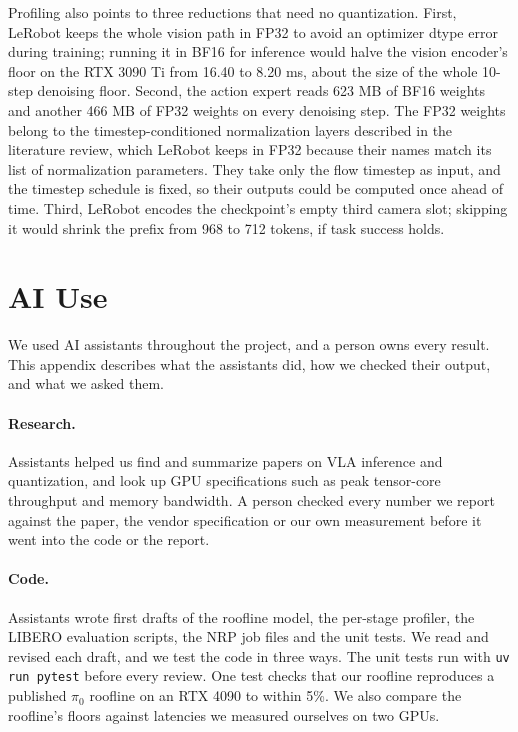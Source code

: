 \documentclass[12pt,letterpaper]{article}
\begin{document}
Profiling also points to three reductions that need no quantization. First, LeRobot keeps the whole vision path in FP32 to avoid an optimizer dtype error during training; running it in BF16 for inference would halve the vision encoder's floor on the RTX 3090 Ti from 16.40 to 8.20 ms, about the size of the whole 10-step denoising floor. Second, the action expert reads 623 MB of BF16 weights and another 466 MB of FP32 weights on every denoising step. The FP32 weights belong to the timestep-conditioned normalization layers described in the literature review, which LeRobot keeps in FP32 because their names match its list of normalization parameters. They take only the flow timestep as input, and the timestep schedule is fixed, so their outputs could be computed once ahead of time. Third, LeRobot encodes the checkpoint's empty third camera slot; skipping it would shrink the prefix from 968 to 712 tokens, if task success holds.


\newpage


\makereference




\appendix
\section{AI Use}

We used AI assistants throughout the project, and a person owns every result. This appendix describes what the assistants did, how we checked their output, and what we asked them.

\paragraph{Research.} Assistants helped us find and summarize papers on VLA inference and quantization, and look up GPU specifications such as peak tensor-core throughput and memory bandwidth. A person checked every number we report against the paper, the vendor specification or our own measurement before it went into the code or the report.

\paragraph{Code.} Assistants wrote first drafts of the roofline model, the per-stage profiler, the LIBERO evaluation scripts, the NRP job files and the unit tests. We read and revised each draft, and we test the code in three ways. The unit tests run with \texttt{uv run pytest} before every review. One test checks that our roofline reproduces a published $\pi_0$ roofline on an RTX 4090 to within 5\%. We also compare the roofline's floors against latencies we measured ourselves on two GPUs.
\end{document}
